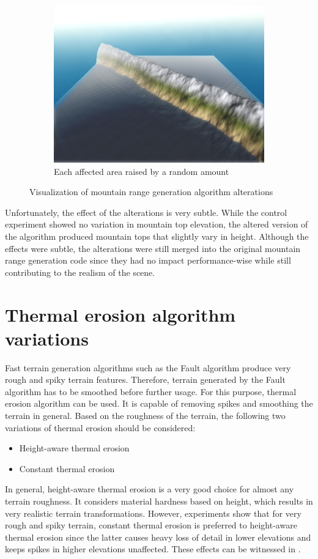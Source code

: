 \documentclass[11pt,a4paper,twoside,openright]{report}
\begin{document}
\begin{figure}[h]
\begin{subfigure}[b]{0.32\textwidth}
    \includegraphics[width=\textwidth]{mountain-range-alteration.png}
    \caption{Each affected area raised by a random amount}
    \label{fig:mountainrangealteration}
  \end{subfigure}
  \caption{Visualization of mountain range generation algorithm alterations}
\end{figure}

\noindent Unfortunately, the effect of the alterations is very subtle. While the control experiment showed no variation in mountain top elevation, the altered version of the algorithm produced mountain tops that slightly vary in height. Although the effects were subtle, the alterations were still merged into the original mountain range generation code since they had no impact performance-wise while still contributing to the realism of the scene.

\section{Thermal erosion algorithm variations}
Fast terrain generation algorithms such as the Fault algorithm produce very rough and spiky terrain features. Therefore, terrain generated by the Fault algorithm has to be smoothed before further usage. For this purpose, thermal erosion algorithm can be used. It is capable of removing spikes and smoothing the terrain in general. Based on the roughness of the terrain, the following two variations of thermal erosion should be considered:
\begin{itemize}
  \item Height-aware thermal erosion
  \item Constant thermal erosion
\end{itemize}
In general, height-aware thermal erosion is a very good choice for almost any terrain roughness. It considers material hardness based on height, which results in very realistic terrain transformations. However, experiments show that for very rough and spiky terrain, constant thermal erosion is preferred to height-aware thermal erosion since the latter causes heavy loss of detail in lower elevations and keeps spikes in higher elevations unaffected. These effects can be witnessed in .
\end{document}
